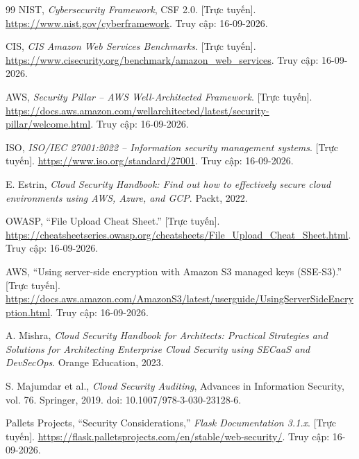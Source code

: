 \begin{thebibliography}{99}
 NIST, \textit{Cybersecurity Framework}, CSF 2.0. [Trực tuyến]. \url{https://www.nist.gov/cyberframework}. Truy cập: 16-09-2026.

 CIS, \textit{CIS Amazon Web Services Benchmarks}. [Trực tuyến]. \url{https://www.cisecurity.org/benchmark/amazon_web_services}. Truy cập: 16-09-2026.

 AWS, \textit{Security Pillar -- AWS Well-Architected Framework}. [Trực tuyến]. \url{https://docs.aws.amazon.com/wellarchitected/latest/security-pillar/welcome.html}. Truy cập: 16-09-2026.

 ISO, \textit{ISO/IEC 27001:2022 -- Information security management systems}. [Trực tuyến]. \url{https://www.iso.org/standard/27001}. Truy cập: 16-09-2026.

 E. Estrin, \textit{Cloud Security Handbook: Find out how to effectively secure cloud environments using AWS, Azure, and GCP}. Packt, 2022.

 OWASP, “File Upload Cheat Sheet.” [Trực tuyến]. \url{https://cheatsheetseries.owasp.org/cheatsheets/File_Upload_Cheat_Sheet.html}. Truy cập: 16-09-2026.

 AWS, “Using server-side encryption with Amazon S3 managed keys (SSE-S3).” [Trực tuyến]. \url{https://docs.aws.amazon.com/AmazonS3/latest/userguide/UsingServerSideEncryption.html}. Truy cập: 16-09-2026.

 A. Mishra, \textit{Cloud Security Handbook for Architects: Practical Strategies and Solutions for Architecting Enterprise Cloud Security using SECaaS and DevSecOps}. Orange Education, 2023.

 S. Majumdar et al., \textit{Cloud Security Auditing}, Advances in Information Security, vol. 76. Springer, 2019. doi: 10.1007/978-3-030-23128-6.

 Pallets Projects, “Security Considerations,” \textit{Flask Documentation 3.1.x}. [Trực tuyến]. \url{https://flask.palletsprojects.com/en/stable/web-security/}. Truy cập: 16-09-2026.

\end{thebibliography}
\appendix
\renewcommand{\chaptername}{PHỤ LỤC}
